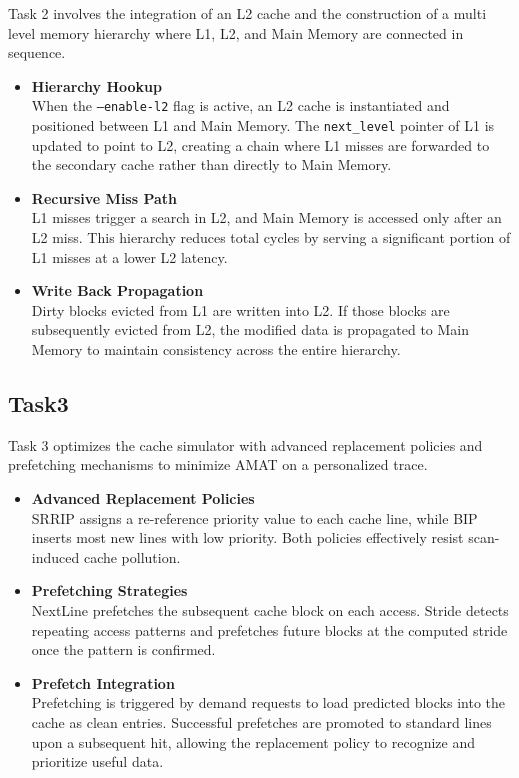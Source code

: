 \documentclass[11pt]{article}
\begin{document}
Task 2 involves the integration of an L2 cache and the construction of a multi level memory hierarchy where L1, L2, and Main Memory are connected in sequence.

\begin{itemize}
\item \textbf{Hierarchy Hookup} \\
When the \texttt{--enable-l2} flag is active, an L2 cache is instantiated and positioned between L1 and Main Memory. The \texttt{next\_level} pointer of L1 is updated to point to L2, creating a chain where L1 misses are forwarded to the secondary cache rather than directly to Main Memory.

\item \textbf{Recursive Miss Path} \\
L1 misses trigger a search in L2, and Main Memory is accessed only after an L2 miss. This hierarchy reduces total cycles by serving a significant portion of L1 misses at a lower L2 latency.

\item \textbf{Write Back Propagation} \\
Dirty blocks evicted from L1 are written into L2. If those blocks are subsequently evicted from L2, the modified data is propagated to Main Memory to maintain consistency across the entire hierarchy.
\end{itemize}

\subsection{Task3}

Task 3 optimizes the cache simulator with advanced replacement policies and prefetching mechanisms to minimize AMAT on a personalized trace.

\begin{itemize}
\item \textbf{Advanced Replacement Policies} \\
SRRIP assigns a re-reference priority value to each cache line, while BIP inserts most new lines with low priority. Both policies effectively resist scan-induced cache pollution.

\item \textbf{Prefetching Strategies} \\
NextLine prefetches the subsequent cache block on each access. Stride detects repeating access patterns and prefetches future blocks at the computed stride once the pattern is confirmed.

\item \textbf{Prefetch Integration} \\
Prefetching is triggered by demand requests to load predicted blocks into the cache as clean entries. Successful prefetches are promoted to standard lines upon a subsequent hit, allowing the replacement policy to recognize and prioritize useful data.
\end{itemize}
\end{document}
